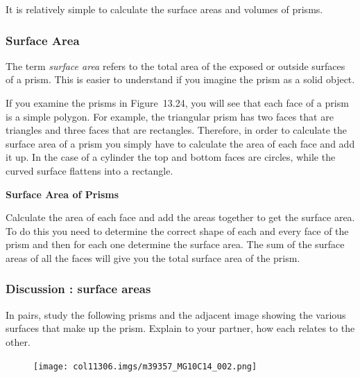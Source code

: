     \addtocounter{footnote}{-0}
    
      \label{m39357*id62698}It is relatively simple to calculate the surface areas and volumes of prisms.\par 
      \label{m39357*uid11}
            \subsubsection{ Surface Area}
            \nopagebreak
            
        
        \label{m39357*id62710}The term \textsl{surface area} refers to the total area of the exposed or outside surfaces of a prism. This is easier to understand if you imagine the prism as a solid object.\par 
        \label{m39357*id62720}If you examine the prisms in Figure~13.24, you will see that each face of a prism is a simple polygon. For example, the triangular prism has two faces that are triangles and three faces that are rectangles. Therefore, in order to calculate the surface area of a prism you simply have to calculate the area of each face and add it up. In the case of a cylinder the top and bottom faces are circles, while the curved surface flattens into a rectangle.\par 
        \label{m39357*id62732}
          \textbf{Surface Area of Prisms}
        \par 
        \label{m39357*id62738}Calculate the area of each face and add the areas together to get the surface area. To do this you need to determine the correct shape of each and every face of the prism and then for each one determine the surface area. The sum of the surface areas of all the faces will give you the total surface area of the prism.\par 
\label{m39357*secfhsst!!!underscore!!!id107}
            \subsubsection{  Discussion : surface areas }
            \nopagebreak
            
        \label{m39357*id62753}In pairs, study the following prisms and the adjacent image showing the various surfaces that make up the prism. Explain to your partner, how each relates to the other.\par 
        
        \label{m39357*id6274366}
    \setcounter{subfigure}{0}


	\begin{figure}[H] %
    \begin{center}
    \label{m39357*id62767!!!underscore!!!media}\label{m39357*id62767!!!underscore!!!printimage}\texttt{[image: col11306.imgs/m39357\_MG10C14\_002.png]} %
        
      \vspace{2pt}
    \vspace{.1in}
    
    \end{center}

 \end{figure}   


